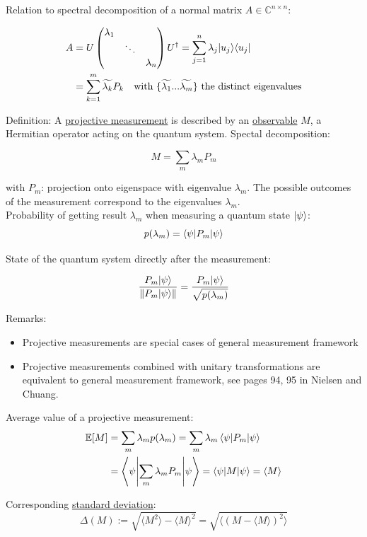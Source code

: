 Relation to spectral decomposition of a normal matrix $A \in \mathbb{C}^{n \times n}$:

\begin{align}
    A &= U \begin{pmatrix*}
        \lambda_1 & & \\
        & \ddots & \\
        & & \lambda_n
    \end{pmatrix*} U^\dag
    = \sum_{j = 1}^n \lambda_j \ket{u_j} \bra{u_j} \\
    &= \sum_{k = 1}^m \widetilde{\lambda_k} P_k \quad 
    \text{with } \{\widetilde{\lambda_1} ... \widetilde{\lambda_m} \} \text{ the distinct eigenvalues}
\end{align}

Definition:
A \underline{projective measurement} is described by an \underline{observable} $M$, 
a Hermitian operator acting on the quantum system.
Spectal decomposition:

\begin{equation}
    M = \sum_m \lambda_m P_m
\end{equation}

with $P_m$: projection onto eigenspace with eigenvalue $\lambda_m$.
The possible outcomes of the measurement correspond to the eigenvalues $\lambda_m$. \\
Probability of getting result $\lambda_m$ when measuring a quantum state $\lvert\psi\rangle$:
\begin{equation}
    p(\lambda_m) = \left \langle \psi \middle| P_m \middle| \psi \right \rangle
\end{equation}

State of the quantum system directly after the measurement:

\begin{equation}
    \frac{P_m \lvert\psi\rangle}{\lVert P_m \lvert\psi\rangle\rVert} = \frac{P_m \lvert\psi\rangle}{\sqrt{p(\lambda_m)}}
\end{equation}

Remarks:
\begin{itemize}
    \item Projective measurements are special cases of general measurement framework
    \item Projective measurements combined with unitary transformations are equivalent to general
    measurement framework, see pages 94, 95 in Nielsen and Chuang.
\end{itemize}

Average value of a projective measurement:
\begin{align}
    \mathbb{E}[M] &= \sum_m \lambda_m p(\lambda_m) = \sum_m \lambda_m \left \langle \psi \middle| P_m \middle| \psi \right \rangle \\
    &= \left \langle \psi \middle| \sum_m \lambda_m P_m \middle| \psi \right \rangle = \left \langle \psi \middle| M \middle| \psi \right \rangle = \langle M \rangle
\end{align}

Corresponding \underline{standard deviation}:
\begin{equation}
   \Delta(M) := \sqrt{\langle M^2 \rangle - \langle M \rangle^2} 
        = \sqrt{\langle (M - \langle M \rangle)^2 \rangle}
\end{equation}